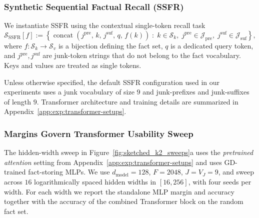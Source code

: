 \subsubsection{Synthetic Sequential Factual Recall (SSFR)}
\label{appendix:ssfr-task}

We instantiate SSFR using the contextual single-token recall task
\[
\mathcal{S}_{\mathrm{SSFR}}[f]
:=
\left\{
\operatorname{concat}(j^{\mathrm{pre}},\, k,\, j^{\mathrm{suf}},\, q,\, f(k))
\;:\;
k\in\mathcal{S}_{k},\;
j^{\mathrm{pre}}\in\mathcal{J}_{\mathrm{pre}},\;
j^{\mathrm{suf}}\in\mathcal{J}_{\mathrm{suf}}
\right\},
\]
where $f:\mathcal{S}_{k}\to\mathcal{S}_{v}$ is a bijection defining the fact set, $q$ is a dedicated query token, and $j^{\mathrm{pre}},j^{\mathrm{suf}}$ are junk-token strings that do not belong to the fact vocabulary. Keys and values are treated as single tokens.

Unless otherwise specified, the default SSFR configuration used in our experiments uses a junk vocabulary of size $9$ and junk-prefixes and junk-suffixes of length $9$.
Transformer architecture and training details are summarized in Appendix~\ref{app:exp:transformer-setups}.

\subsubsection{Margins Govern Transformer Usability Sweep}
\label{app:exp:section3:hidden-width}
The hidden-width sweep in Figure~\ref{fig:sketched_k2_sweeps}a uses the \emph{pretrained attention} setting from Appendix~\ref{app:exp:transformer-setups} and uses GD-trained fact-storing MLPs.
We use $d_{\mathrm{model}}=128$,
$F=2048$, $J=V_J=9$, and sweep across $16$ logarithmically spaced hidden widths in $[16,256]$, with four seeds per width.
For each width we report the standalone MLP margin and accuracy together with the accuracy of the combined Transformer block on the random fact set.


